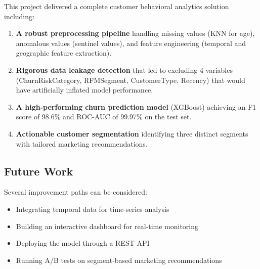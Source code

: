 \documentclass[12pt,a4paper]{article}
\begin{document}
This project delivered a complete customer behavioral analytics solution including:

\begin{enumerate}
    \item \textbf{A robust preprocessing pipeline} handling missing values (KNN for age), anomalous values (sentinel values), and feature engineering (temporal and geographic feature extraction).

    \item \textbf{Rigorous data leakage detection} that led to excluding 4 variables (ChurnRiskCategory, RFMSegment, CustomerType, Recency) that would have artificially inflated model performance.

    \item \textbf{A high-performing churn prediction model} (XGBoost) achieving an F1 score of 98.6\% and ROC-AUC of 99.97\% on the test set.

    \item \textbf{Actionable customer segmentation} identifying three distinct segments with tailored marketing recommendations.
\end{enumerate}

\subsection{Future Work}

Several improvement paths can be considered:
\begin{itemize}
    \item Integrating temporal data for time-series analysis
    \item Building an interactive dashboard for real-time monitoring
    \item Deploying the model through a REST API
    \item Running A/B tests on segment-based marketing recommendations
\end{itemize}
\end{document}
